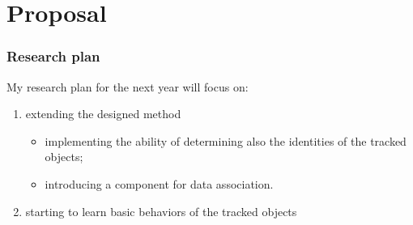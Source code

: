 \section{Proposal}

\begin{frame}
	\frametitle{Research plan}
	
	\vspace{0.5cm}
	
	My research plan for the next year will focus on:
	
	\vspace{0.15cm}
	
	\begin{enumerate}
		\item extending the designed method
			  \begin{itemize}
		  		  \item implementing the ability of determining also the identities of the tracked objects;
			  	  \item introducing a component for data association.
			  \end{itemize}
		\item starting to learn basic behaviors of the tracked objects
	\end{enumerate}
\end{frame}

